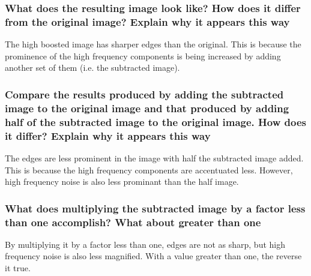 \subsubsection{What does the resulting image look like? How does it differ from the original image? Explain why it
appears this way}
The high boosted image has sharper edges than the original. This is because the prominence of the high frequency components is being increased by adding another set of them (i.e. the subtracted image).

\subsubsection{Compare the results produced by adding the subtracted image to the original image and that produced
by adding half of the subtracted image to the original image. How does it differ? Explain why it
appears this way}
The edges are less prominent in the image with half the subtracted image added. This is because the high frequency components are accentuated less. However, high frequency noise is also less prominant than the half image.

\subsubsection{What does multiplying the subtracted image by a factor less than one accomplish? What about greater
than one}

By multiplying it by a factor less than one, edges are not as sharp, but high frequency noise is also less magnified. With a value greater than one, the reverse it true.
